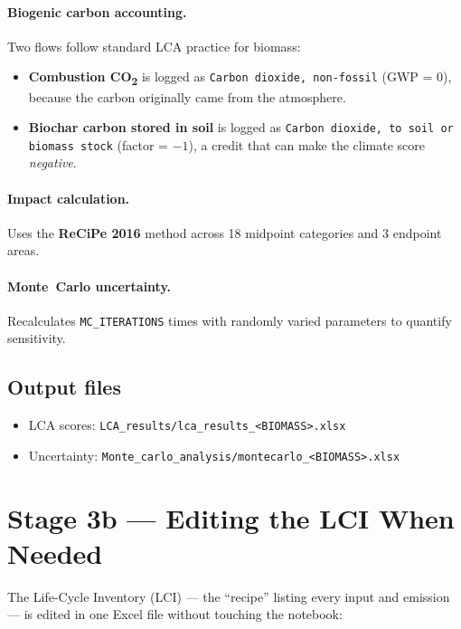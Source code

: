 \documentclass[11pt, a4paper]{article}
\newcommand{\code}[1]{\texttt{#1}}
\begin{document}
\paragraph{Biogenic carbon accounting.} Two flows follow standard LCA practice for biomass:

\begin{itemize}
  \item \textbf{Combustion CO\textsubscript{2}} is logged as \code{Carbon dioxide, non-fossil} (GWP = 0), because the carbon originally came from the atmosphere.
  \item \textbf{Biochar carbon stored in soil} is logged as \code{Carbon dioxide, to soil or biomass stock} (factor = $-1$), a credit that can make the climate score \emph{negative}.
\end{itemize}

\paragraph{Impact calculation.} Uses the \textbf{ReCiPe 2016} method across 18 midpoint categories and 3 endpoint areas.

\paragraph{Monte~Carlo uncertainty.} Recalculates \code{MC\_ITERATIONS} times with randomly varied parameters to quantify sensitivity.

\subsection{Output files}

\begin{itemize}
  \item LCA scores: \code{LCA\_results/lca\_results\_<BIOMASS>.xlsx}
  \item Uncertainty: \code{Monte\_carlo\_analysis/montecarlo\_<BIOMASS>.xlsx}
\end{itemize}

\section{Stage 3b — Editing the LCI When Needed}
\label{sec:lci}

The Life-Cycle Inventory (LCI) — the ``recipe'' listing every input and emission — is edited in one Excel file without touching the notebook:
\end{document}
